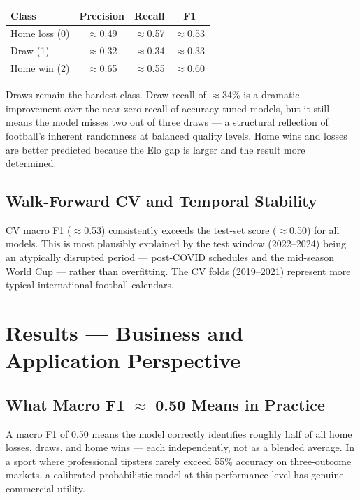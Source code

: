 \documentclass[12pt,a4paper,openany]{report}
\begin{document}
\begin{center}
\begin{tabular}{lccc}
  \toprule
  \textbf{Class} & \textbf{Precision} & \textbf{Recall} & \textbf{F1} \\
  \midrule
  Home loss (0) & $\approx$0.49 & $\approx$0.57 & $\approx$0.53 \\
  \rowcolor{LightBlue}
  Draw (1) & $\approx$0.32 & $\approx$0.34 & $\approx$0.33 \\
  Home win (2) & $\approx$0.65 & $\approx$0.55 & $\approx$0.60 \\
  \bottomrule
\end{tabular}
\end{center}

\medskip
Draws remain the hardest class. Draw recall of $\approx$34\% is a dramatic improvement
over the near-zero recall of accuracy-tuned models, but it still means the
model misses two out of three draws --- a structural reflection of football's
inherent randomness at balanced quality levels. Home wins and losses are better
predicted because the Elo gap is larger and the result more determined.

\section{Walk-Forward CV and Temporal Stability}

CV macro F1 ($\approx$0.53) consistently exceeds the test-set score ($\approx$0.50) for all
models. This is most plausibly explained by the test window (2022--2024) being
an atypically disrupted period --- post-COVID schedules and the mid-season World
Cup --- rather than overfitting. The CV folds (2019--2021) represent more typical
international football calendars.

\chapter{Results --- Business and Application Perspective}

\section{What Macro F1 $\approx$ 0.50 Means in Practice}

A macro F1 of 0.50 means the model correctly identifies roughly half of all
home losses, draws, and home wins --- each independently, not as a blended
average. In a sport where professional tipsters rarely exceed 55\% accuracy on
three-outcome markets, a calibrated probabilistic model at this performance
level has genuine commercial utility.
\end{document}
